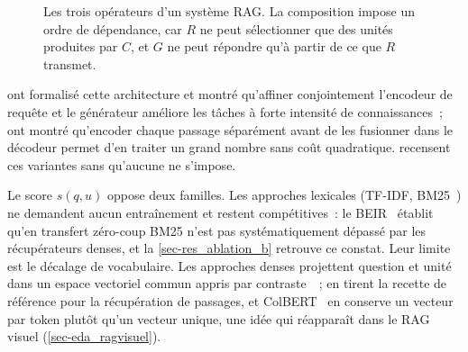 \begin{figure}[H]
\centering
{}
\caption[Les trois opérateurs d'un système RAG]{Les trois opérateurs d'un
système RAG. La composition impose un ordre de dépendance, car $R$ ne peut
sélectionner que des unités produites par $C$, et $G$ ne peut répondre qu'à
partir de ce que $R$ transmet.}
\label{fig-eda_rag_chaine}
\end{figure}
\citet{rag2020} ont formalisé cette architecture et montré qu'affiner
conjointement l'encodeur de requête et le générateur améliore les tâches à
forte intensité de connaissances~; \citet{fid2021} ont montré qu'encoder
chaque passage séparément avant de les fusionner dans le décodeur permet d'en
traiter un grand nombre sans coût quadratique. \citet{ragsurvey2023} recensent
ces variantes sans qu'aucune ne s'impose.

Le score $s(q,u)$ oppose deux familles. Les approches lexicales
(TF-IDF, BM25~\citep{bm25_2009}) ne demandent aucun entraînement et restent
compétitives~: le  BEIR~\citep{beir2021} établit qu'en
transfert zéro-coup BM25 n'est pas systématiquement dépassé par les
récupérateurs denses, et la \cref{sec-res_ablation_b} retrouve ce constat.
Leur limite est le décalage de vocabulaire. Les approches denses
projettent question et unité dans un espace vectoriel commun appris par
contraste~\citep{sbert2019, simcse2021}~; \citet{dpr2020} en tirent la recette
de référence pour la récupération de passages, et ColBERT~\citep{colbert2020}
en conserve un vecteur par token plutôt qu'un vecteur unique, une idée qui
réapparaît dans le RAG visuel (\cref{sec-eda_ragvisuel}).

